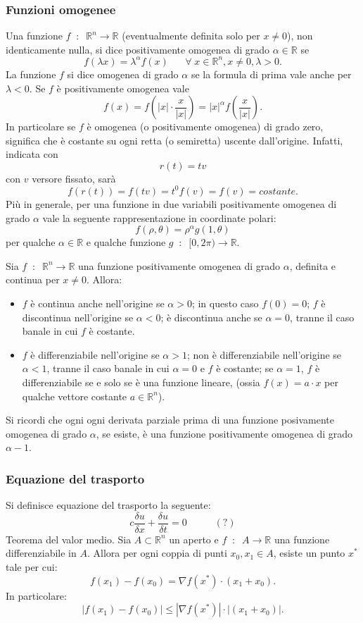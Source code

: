 \subsubsection*{Funzioni omogenee}
Una funzione $f \;\;:\;\; \mathbb{R}^n \rightarrow \mathbb{R}$ (eventualmente definita solo per $x\neq 0$), non identicamente nulla, si dice positivamente omogenea di grado $\alpha \in \mathbb{R}$ se
\[
    f(\lambda x) = \lambda^\alpha f(x) \;\;\;\;\; \;\forall\;x \in \mathbb{R}^n, x\neq 0, \lambda>0.
\]
La funzione $f$ si dice omogenea di grado $\alpha$ se la formula di prima vale anche per $\lambda<0$.\newline
Se $f$ è positivamente omogenea vale
\[
    f(x) = f( |x| \cdot \frac{x}{|x|}) = |x|^\alpha f(\frac{x}{|x|}).
\]
In particolare se $f$ è omogenea (o positivamente omogenea) di grado zero, significa che è costante su ogni retta (o semiretta) uscente dall'origine. Infatti, indicata con
\[
    r(t)=tv
\]
con $v$ versore fissato, sarà
\[
    f(r(t))=f(tv)=t^0f(v)=f(v)=costante.
\]
Più in generale, per una funzione in due variabili positivamente omogenea di grado $\alpha$ vale la seguente rappresentazione in coordinate polari:
\[
    f(\rho, \theta)=\rho^\alpha g(1,\theta)
\]
per qualche $\alpha \in \mathbb{R}$ e qualche funzione $g \;\;:\;\; [0, 2\pi) \rightarrow \mathbb{R}$.\newline

Sia $f \;\;:\;\; \mathbb{R}^n \rightarrow \mathbb{R}$ una funzione positivamente omogenea di grado $\alpha$, definita e continua per $x\neq 0$. Allora:
\begin{itemize}
    \item $f$ è continua anche nell'origine se $\alpha>0$; in questo caso $f(0) = 0$; $f$ è discontinua nell'origine se $\alpha<0$; è discontinua anche se $\alpha=0$, tranne il caso banale in cui $f$ è costante.
    \item $f$ è differenziabile nell'origine se $\alpha>1$; non è differenziabile nell'origine se $\alpha <1$, tranne il caso banale in cui $\alpha=0$ e $f$ è costante; se $\alpha=1$, $f$ è differenziabile se e solo se è una funzione lineare, (ossia $f(x) = a \cdot x$ per qualche vettore costante $a \in \mathbb{R}^n$).
\end{itemize}
Si ricordi che ogni ogni derivata parziale prima di una funzione posivamente omogenea di grado $\alpha$, se esiste, è una funzione positivamente omogenea di grado $\alpha -1$. \newline
\subsubsection*{Equazione del trasporto}
Si definisce equazione del trasporto la seguente:
\[
    c \frac{\delta u}{\delta x} + \frac{\delta u}{\delta t} = 0 \;\;\;\;\; \;\;\;\;\; (?)
\]
\newline
Teorema del valor medio. Sia $A \subset \mathbb{R}^n$ un aperto e $f \;\;:\;\; A \rightarrow \mathbb{R}$ una funzione differenziabile in $A$. Allora per ogni coppia di punti $x_0, x_1 \in A$, esiste un punto $x^*$ tale per cui:
\[
    f(x_1)- f(x_0) = \nabla f(x^*) \cdot  (x_1 + x_0).
\]
In particolare:
\[
    |f(x_1) - f(x_0)| \leq |\nabla f(x^*)| \cdot |(x_1 + x_0)|.
\]

